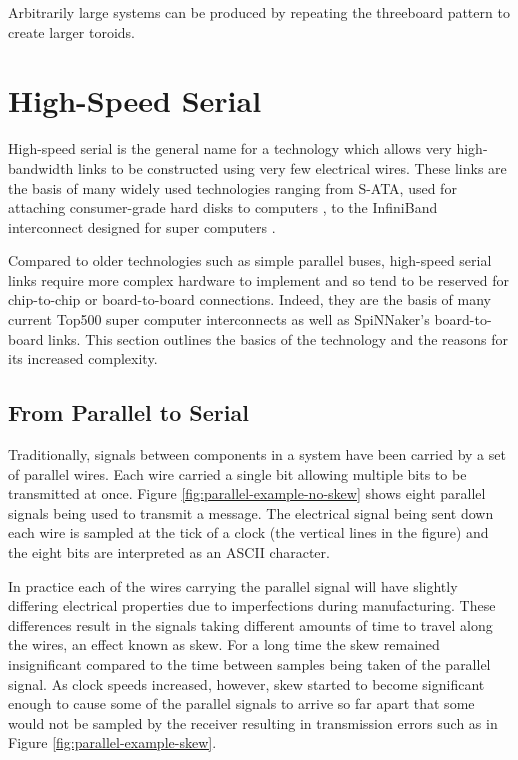 			Arbitrarily large systems can be produced by repeating the threeboard
			pattern to create larger toroids.
	
	\section{High-Speed Serial}
		
		\label{sec:high-speed-serial}
		
		
		High-speed serial is the general name for a technology which allows very
		high-bandwidth links to be constructed using very few electrical wires.
		These links are the basis of many widely used technologies ranging from
		S-ATA, used for attaching consumer-grade hard disks to computers
		\cite{sataio}, to the InfiniBand interconnect designed for super computers
		\cite{infinibandta}.
		
		Compared to older technologies such as simple parallel buses, high-speed
		serial links require more complex hardware to implement and so tend to be
		reserved for chip-to-chip or board-to-board connections. Indeed, they are
		the basis of many current Top500 super computer interconnects as well as
		SpiNNaker's board-to-board links. This section outlines the basics of the
		technology and the reasons for its increased complexity.
		
		\subsection{From Parallel to Serial}
			
			Traditionally, signals between components in a system have been carried by
			a set of parallel wires. Each wire carried a single bit allowing multiple
			bits to be transmitted at once. Figure \ref{fig:parallel-example-no-skew}
			shows eight parallel signals being used to transmit a message. The
			electrical signal being sent down each wire is sampled at the tick of a
			clock (the vertical lines in the figure) and the eight bits are
			interpreted as an ASCII character.
			
			In practice each of the wires carrying the parallel signal will have
			slightly differing electrical properties due to imperfections during
			manufacturing. These differences result in the signals taking different
			amounts of time to travel along the wires, an effect known as skew. For a
			long time the skew remained insignificant compared to the time between
			samples being taken of the parallel signal. As clock speeds increased,
			however, skew started to become significant enough to cause some of the
			parallel signals to arrive so far apart that some would not be sampled by
			the receiver resulting in transmission errors such as in Figure
			\ref{fig:parallel-example-skew}.
			
